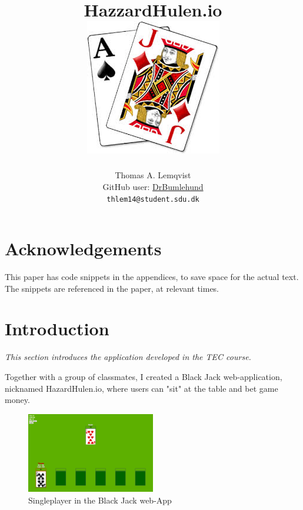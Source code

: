 \documentclass[a4paper]{article}
\title{HazzardHulen.io\\[4cm]
\includegraphics[width=.7\textwidth]{../blackjack}
\vfill}
\author{
  Thomas A. Lemqvist\\
  GitHub user: \href{https://github.com/DrBumlehund}{DrBumlehund}\\
  \texttt{thlem14@student.sdu.dk}
}
\begin{document}
\pagestyle{fancy}
\fancyhf{}

\maketitle
\thispagestyle{empty}
\newpage
\hspace{0cm}
\vfill
\tableofcontents

\vfill

\section*{Acknowledgements}
This paper has code snippets in the appendices, to save space for the actual text. The snippets are referenced in the paper, at relevant times.

\vfill
\newpage

\setcounter{page}{1}




\section{Introduction}
\textit{This section introduces the application developed in the TEC course.}

Together with a group of classmates, I created a Black Jack web-application, nicknamed HazardHulen.io, where users can "sit" at the table and bet game money.

\begin{figure}[H]
  \centering
  \includegraphics[width=0.5\textwidth]{images/singleplayer}	
  \caption{Singleplayer in the Black Jack web-App}
  \label{sp:bj}
\end{figure}
\end{document}
